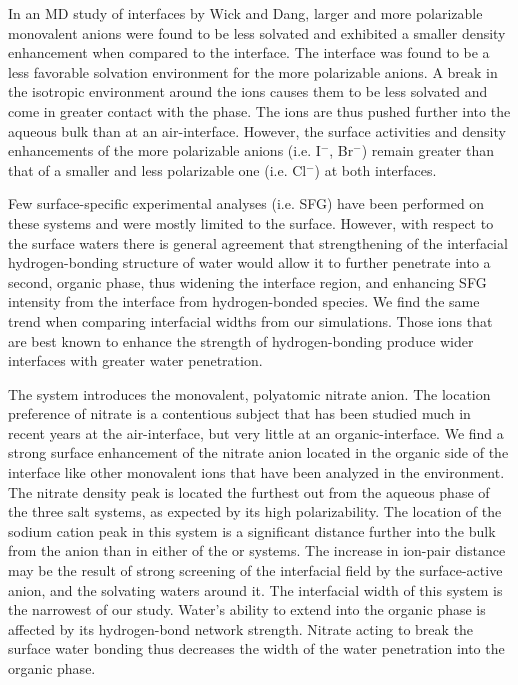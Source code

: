 In an MD study of \ctcwat interfaces by Wick and Dang,\cite{Wick2007a} larger and more polarizable monovalent anions were found to be less solvated and exhibited a smaller density enhancement when compared to the \airwat interface. The \ctcwat interface was found to be a less favorable solvation environment for the more polarizable anions. A break in the isotropic environment around the ions causes them to be less solvated and come in greater contact with the \ctc phase. The ions are thus pushed further into the aqueous bulk than at an air-interface. However, the surface activities and density enhancements of the more polarizable anions (i.e. I$^-$, Br$^-$) remain greater than that of a smaller and less polarizable one (i.e. Cl$^-$) at both interfaces. 

Few surface-specific experimental analyses (i.e. SFG) have been performed on these \ctc systems and were mostly limited to the \airwat surface. However, with respect to the surface waters there is general agreement that strengthening of the interfacial hydrogen-bonding structure of water would allow it to further penetrate into a second, organic phase, thus widening the interface region, and enhancing SFG intensity from the interface from hydrogen-bonded species. We find the same trend when comparing interfacial widths from our simulations. Those ions that are best known to enhance the strength of hydrogen-bonding produce wider interfaces with greater water penetration.

The \sodnit system introduces the monovalent, polyatomic nitrate anion. The location preference of nitrate is a contentious subject that has been studied much in recent years at the air-\wat interface,\cite{Brown2009,Thomas2007} but very little at an organic-\wat interface. We find a strong surface enhancement of the nitrate anion located in the organic side of the interface like other monovalent ions that have been analyzed in the \ctcwat environment.\cite{Wick2007a} The nitrate density peak is located the furthest out from the aqueous phase of the three salt systems, as expected by its high polarizability. The location of the sodium cation peak in this system is a significant distance further into the bulk from the anion than in either of the \nacl or \sodsul systems. The increase in ion-pair distance may be the result of strong screening of the interfacial field by the surface-active anion, and the solvating waters around it. The interfacial width of this system is the narrowest of our study. Water's ability to extend into the organic phase is affected by its hydrogen-bond network strength. Nitrate acting to break the surface water bonding thus decreases the width of the water penetration into the organic phase. 

